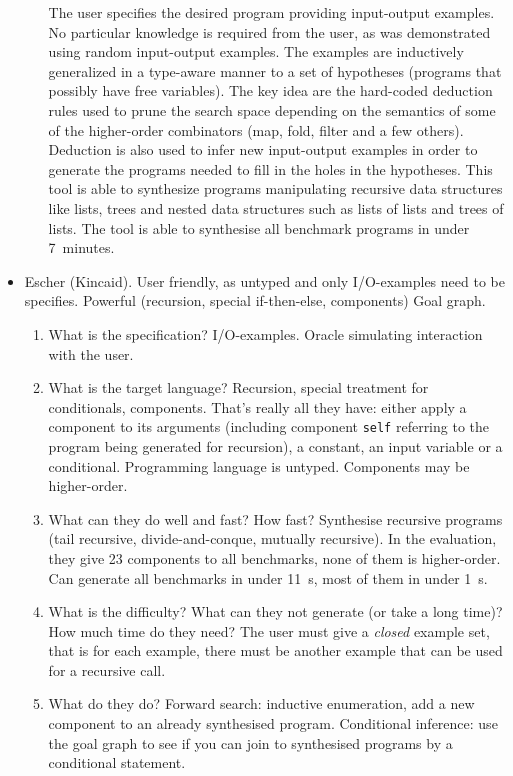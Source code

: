 \begin{itemize}
\begin{enumerate}
The user specifies the desired program providing input-output examples.  
No particular knowledge is required from the user, as was demonstrated using random input-output examples.
The examples are inductively generalized in a type-aware manner to a set of hypotheses (programs that possibly have free variables).
The key idea are the hard-coded deduction rules used to prune the search space depending on the semantics of some of the higher-order combinators (map, fold, filter and a few others).
Deduction is also used to infer new input-output examples in order to generate the programs needed to fill in the holes in the hypotheses.
This tool is able to synthesize programs manipulating recursive data structures like lists, trees and nested data structures such as lists of lists and trees of lists.
The tool is able to synthesise all benchmark programs in under 7~minutes.
\end{enumerate}
\item Escher (Kincaid). User friendly, as untyped and only I/O-examples need to be specifies. Powerful (recursion, special if-then-else, components) Goal graph.
\begin{enumerate}
\item What is the specification?
I/O-examples. Oracle simulating interaction with the user.
\item What is the target language?
Recursion, special treatment for conditionals, components. That's really all they have: either apply a component to its arguments (including component \lstinline?self? referring to the program being generated for recursion), a constant, an input variable or a conditional. Programming language is untyped. Components may be higher-order.
\item What can they do well and fast? How fast?
Synthesise recursive programs (tail recursive, divide-and-conque, mutually recursive). In the evaluation, they give 23 components to all benchmarks, none of them is higher-order. Can generate all benchmarks in under 11~s, most of them in under 1~s.
\item What is the difficulty? What can they not generate (or take a long time)? How much time do they need?
The user must give a \emph{closed} example set, that is for each example, there must be another example that can be used for a recursive call.
\item What do they do?
Forward search: inductive enumeration, add a new component to an already synthesised program.
Conditional inference: use the goal graph to see if you can join to synthesised programs by a conditional statement.

\end{enumerate}
\end{itemize}
